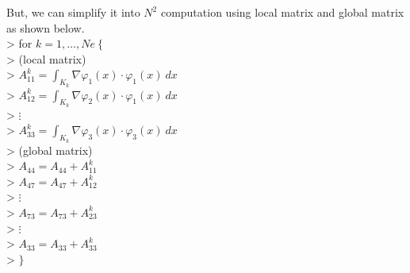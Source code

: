 \documentclass[a4paper,10pt]{article}
\begin{document}
But, we can simplify it into $ N^2 $ computation using local matrix and global matrix as shown below.\\
\textgreater \hspace{1cm} for $ k=1, \dots, Ne \ \{$\\
\textgreater \hspace{1.5cm} (local matrix)\\
\textgreater \hspace{1.5cm} $ A_{11}^{k} = \int_{K_{k}} \nabla \varphi_{1}(x) \cdot \varphi_{1}(x) \ dx $ \\
\textgreater \hspace{1.5cm} $ A_{12}^{k} = \int_{K_{k}} \nabla \varphi_{2}(x) \cdot \varphi_{1}(x) \ dx $ \\
\textgreater \hspace{3.5cm} $ \vdots $ \\
\textgreater \hspace{1.5cm} $ A_{33}^{k} = \int_{K_{k}} \nabla \varphi_{3}(x) \cdot \varphi_{3}(x) \ dx $ \\
\textgreater \hspace{1.5cm} (global matrix) \\
\textgreater \hspace{1.5cm} $ A_{44}= A_{44} + A_{11}^{k}$ \\
\textgreater \hspace{1.5cm} $ A_{47}= A_{47} + A_{12}^{k}$ \\
\textgreater \hspace{2.5cm} $ \vdots $ \\
\textgreater \hspace{1.5cm} $ A_{73}= A_{73} + A_{23}^{k}$ \\
\textgreater \hspace{2.5cm} $ \vdots $ \\
\textgreater \hspace{1.5cm} $ A_{33}= A_{33} + A_{33}^{k}$ \\
\textgreater \hspace{1cm} $ \}$ \\
\end{document}
